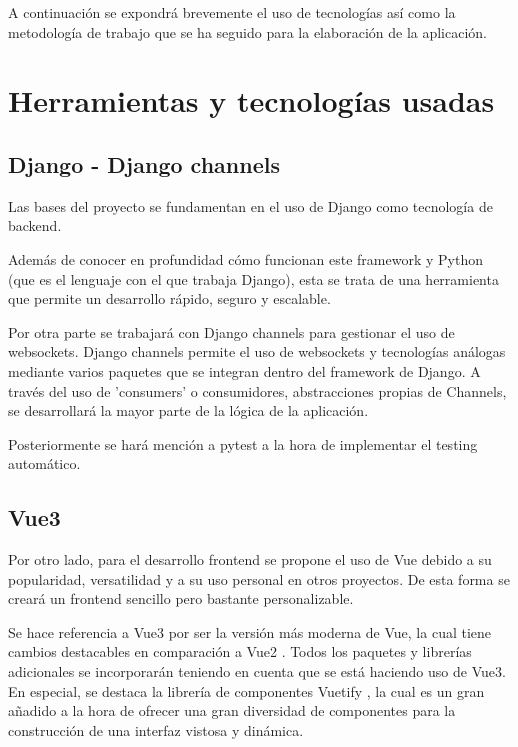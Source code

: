 A continuación se expondrá brevemente el uso de tecnologías así como la metodología
de trabajo que se ha seguido para la elaboración de la aplicación.

\section{Herramientas y tecnologías usadas}

\subsection{Django - Django channels}

Las bases del proyecto se fundamentan en el uso de Django \cite{django} como tecnología de backend.

Además de conocer en profundidad cómo funcionan este framework y Python (que es el lenguaje con el que trabaja Django),
esta se trata de una herramienta que permite un desarrollo rápido, seguro y escalable.

Por otra parte se trabajará con Django channels \cite{djangoChannels} para gestionar el uso de websockets. Django channels
permite el uso de websockets y tecnologías análogas mediante varios paquetes que se integran dentro del framework de Django.
A través del uso de 'consumers' o consumidores, abstracciones propias de Channels, 
se desarrollará la mayor parte de la lógica de la aplicación. 

Posteriormente se hará mención a pytest \cite{pytest} a la hora de implementar el testing automático.

\subsection{Vue3}

Por otro lado, para el desarrollo frontend se propone el uso de Vue \cite{vue3} debido a su popularidad, versatilidad
y a su uso personal en otros proyectos. De esta forma se creará un frontend sencillo pero bastante personalizable.

Se hace referencia a Vue3 por ser la versión más moderna de Vue, la cual tiene cambios destacables en comparación
a Vue2 \cite{vue3vue2}. Todos los paquetes y librerías adicionales se incorporarán teniendo en cuenta que se está haciendo uso de
Vue3. En especial, se destaca la librería de componentes Vuetify \cite{vuetify}, la cual es un gran añadido a la hora de
ofrecer una gran diversidad de componentes para la construcción de una interfaz vistosa y dinámica.

